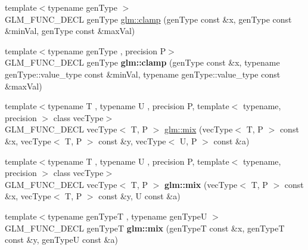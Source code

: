 \begin{DoxyCompactItemize}
\item 
{\footnotesize template$<$typename gen\-Type $>$ }\\G\-L\-M\-\_\-\-F\-U\-N\-C\-\_\-\-D\-E\-C\-L gen\-Type \hyperlink{group__core__func__common_ga72e9e213c84f06a329a2a838b51200f4}{glm\-::clamp} (gen\-Type const \&x, gen\-Type const \&min\-Val, gen\-Type const \&max\-Val)
\item 
\hypertarget{group__core__func__common_ga5409c55a5f3aaae3e02ed440a47380bb}{{\footnotesize template$<$typename gen\-Type , precision P$>$ }\\G\-L\-M\-\_\-\-F\-U\-N\-C\-\_\-\-D\-E\-C\-L gen\-Type {\bfseries glm\-::clamp} (gen\-Type const \&x, typename gen\-Type\-::value\-\_\-type const \&min\-Val, typename gen\-Type\-::value\-\_\-type const \&max\-Val)}\label{group__core__func__common_ga5409c55a5f3aaae3e02ed440a47380bb}

\item 
{\footnotesize template$<$typename T , typename U , precision P, template$<$ typename, precision $>$ class vec\-Type$>$ }\\G\-L\-M\-\_\-\-F\-U\-N\-C\-\_\-\-D\-E\-C\-L vec\-Type$<$ T, P $>$ \hyperlink{group__core__func__common_gadccbaffe46f369cf1a96b2aef92cbfdd}{glm\-::mix} (vec\-Type$<$ T, P $>$ const \&x, vec\-Type$<$ T, P $>$ const \&y, vec\-Type$<$ U, P $>$ const \&a)
\item 
\hypertarget{group__core__func__common_gaa5c83ada94113757c0a555ab4f40cd6e}{{\footnotesize template$<$typename T , typename U , precision P, template$<$ typename, precision $>$ class vec\-Type$>$ }\\G\-L\-M\-\_\-\-F\-U\-N\-C\-\_\-\-D\-E\-C\-L vec\-Type$<$ T, P $>$ {\bfseries glm\-::mix} (vec\-Type$<$ T, P $>$ const \&x, vec\-Type$<$ T, P $>$ const \&y, U const \&a)}\label{group__core__func__common_gaa5c83ada94113757c0a555ab4f40cd6e}

\item 
\hypertarget{group__core__func__common_ga78aae7eea618ca112053d59fe03db239}{{\footnotesize template$<$typename gen\-Type\-T , typename gen\-Type\-U $>$ }\\G\-L\-M\-\_\-\-F\-U\-N\-C\-\_\-\-D\-E\-C\-L gen\-Type\-T {\bfseries glm\-::mix} (gen\-Type\-T const \&x, gen\-Type\-T const \&y, gen\-Type\-U const \&a)}\label{group__core__func__common_ga78aae7eea618ca112053d59fe03db239}


\end{DoxyCompactItemize}
